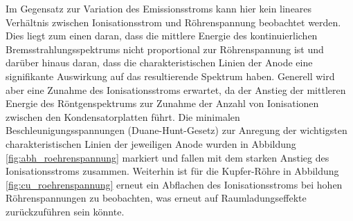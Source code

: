 \documentclass[11pt, a4paper]{article}
\numberwithin{equation}{section}
\begin{document}
Im Gegensatz zur Variation des Emissionsstroms kann hier kein lineares Verhältnis zwischen Ionisationsstrom und Röhrenspannung beobachtet werden.
Dies liegt zum einen daran, dass die mittlere Energie des kontinuierlichen Bremsstrahlungsspektrums nicht proportional zur Röhrenspannung ist und darüber hinaus daran, dass die charakteristischen Linien der Anode eine signifikante Auswirkung auf das resultierende Spektrum haben.
Generell wird aber eine Zunahme des Ionisationsstroms erwartet, da der Anstieg der mittleren Energie des Röntgenspektrums zur Zunahme der Anzahl von Ionisationen zwischen den Kondensatorplatten führt.
Die minimalen Beschleunigungsspannungen (Duane-Hunt-Gesetz) zur Anregung der wichtigsten charakteristischen Linien der jeweiligen Anode wurden in Abbildung \ref{fig:abh_roehrenspannung} markiert und fallen mit dem starken Anstieg des Ionisationsstroms zusammen.
Weiterhin ist für die Kupfer-Röhre in Abbildung \ref{fig:cu_roehrenspannung} erneut ein Abflachen des Ionisationsstroms bei hohen Röhrenspannungen zu beobachten, was erneut auf Raumladungseffekte zurückzuführen sein könnte.
\end{document}
